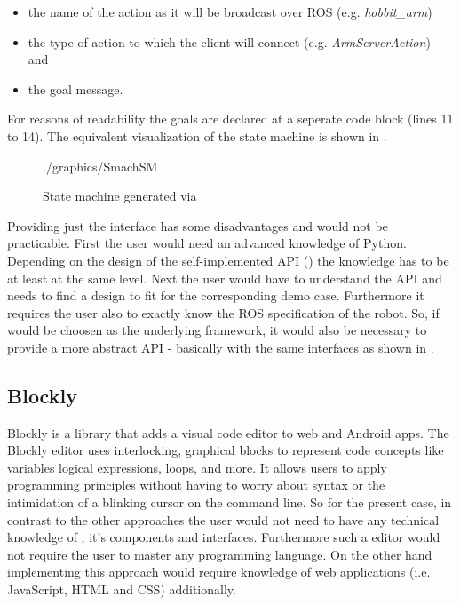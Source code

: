 \begin{itemize}
	\item the name of the action as it will be broadcast over ROS (e.g. \textit{hobbit\_arm})
	\item the type of action to which the client will connect (e.g. \textit{ArmServerAction}) and
	\item the goal message.
\end{itemize}

For reasons of readability the goals are declared at a seperate code block (lines 11 to 14). The equivalent visualization of the state machine is shown in . \\

\begin{figure}[htbp]
	
\end{figure}

\begin{figure}[htbp]
	\centering
	\begin{overpic}[width=0.7\linewidth]{./graphics/SmachSM}
	\end{overpic}
	\caption{State machine generated via }%
	\label{fig:SmachSM}%
\end{figure}

Providing just the \smach{} interface has some disadvantages and would not be practicable. First the user would need an advanced knowledge of Python. Depending on the design of the self-implemented API () the knowledge has to be at least at the same level. Next the user would have to understand the API and needs to find a design to fit for the corresponding demo case. Furthermore it requires the user also to exactly know the ROS specification of the robot. So, if \smach{} would be choosen as the underlying framework, it would also be necessary to provide a more abstract API - basically with the same interfaces as shown in .

\subsection{Blockly}
Blockly is a library that adds a visual code editor to web and Android apps. The Blockly editor uses interlocking, graphical blocks to represent code concepts like variables logical expressions, loops, and more. It allows users to apply programming principles without having to worry about syntax or the intimidation of a blinking cursor on the command line. \cite{BlocklyIntro} So for the present case, in contrast to the other approaches the user would not need to have any technical knowledge of \hobbit{}, it's components and interfaces. Furthermore such a editor would not require the user to master any programming language. On the other hand implementing this approach would require knowledge of web applications (i.e. JavaScript, HTML and CSS) additionally. \\

